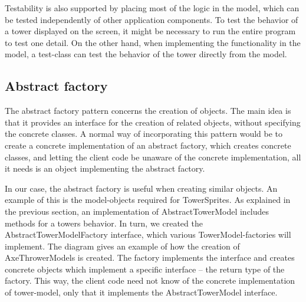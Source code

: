 Testability is also supported by placing most of the logic in the model, which can be tested independently of other application components. To test the behavior of a tower displayed on the screen, it might be necessary to run the entire program to test one detail. On the other hand, when implementing the functionality in the model, a test-class can test the behavior of the tower directly from the model.

\subsection{Abstract factory}

The abstract factory pattern concerns the creation of objects. The main idea is that it provides an interface for the creation of related objects, without specifying the concrete classes. A normal way of incorporating this pattern would be to create a concrete implementation of an abstract factory, which creates concrete classes, and letting the client code be unaware of the concrete implementation, all it needs is an object implementing the abstract factory. \cite{wiki:abfac}  

In our case, the abstract factory is useful when creating similar objects. An example of this is the model-objects required for TowerSprites. As explained in the previous section, an implementation of AbstractTowerModel includes methods for a towers behavior. In turn, we created the AbstractTowerModelFactory interface, which various TowerModel-factories will implement. The diagram gives an example of how the creation of AxeThrowerModels is created. The factory implements the interface and creates concrete objects which implement a specific interface -- the return type of the factory. This way, the client code need not know of the concrete implementation of tower-model, only that it implements the AbstractTowerModel interface.


